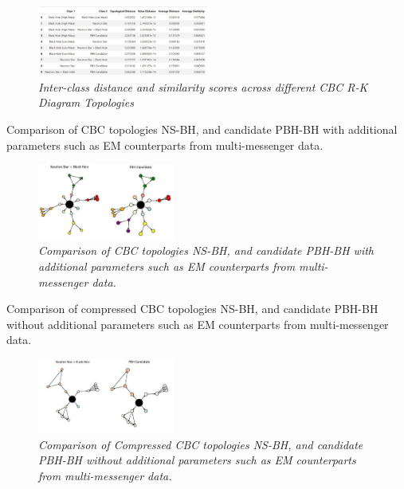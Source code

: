\begin{figure}[H]
 	\centering
        \includegraphics[width=0.5\textwidth]{images/Interclass_distance_and_similarity_scores.jpg}
	\caption{\textit{Inter-class distance and similarity scores across different CBC R-K Diagram Topologies}}
	\label{fig:Inter-class_distance}
\end{figure}


Comparison of CBC topologies NS-BH, and candidate PBH-BH with additional parameters such as EM counterparts from multi-messenger data.

\begin{figure}[H]
 	\centering
        \includegraphics[width=0.4\textwidth]{images/Multiparameter comparison_NSBH_PBH.jpg}
	\caption{\textit{Comparison of CBC topologies NS-BH, and candidate PBH-BH with additional parameters such as EM counterparts from multi-messenger data.}}
	\label{fig:Multi-NSBH-PBH}
\end{figure}


Comparison of compressed CBC topologies NS-BH, and candidate PBH-BH without additional parameters such as EM counterparts from multi-messenger data.

\begin{figure}[H]
 	\centering
        \includegraphics[width=0.4\textwidth]{images/Compressed_Parameter_Comparison_NSBH_PBH.jpg}
	\caption{\textit{Comparison of Compressed CBC topologies NS-BH, and candidate PBH-BH without additional parameters such as EM counterparts from multi-messenger data.
}}
	\label{fig:Compressed_NSBH-PBH}
\end{figure}



